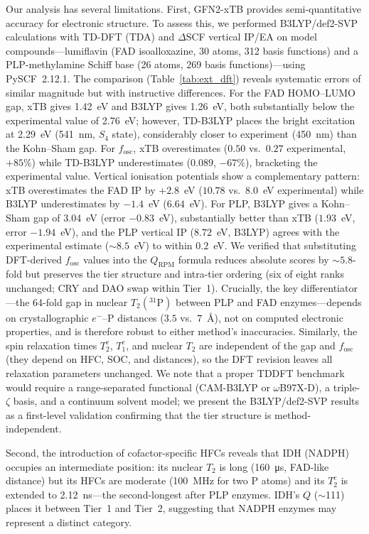 \documentclass[11pt]{article}
\begin{document}
Our analysis has several limitations. First, GFN2-xTB provides semi-quantitative accuracy for electronic structure. To assess this, we performed B3LYP/def2-SVP calculations with TD-DFT (TDA) and $\Delta$SCF vertical IP/EA on model compounds---lumiflavin (FAD isoalloxazine, 30 atoms, 312 basis functions) and a PLP-methylamine Schiff base (26 atoms, 269 basis functions)---using PySCF~2.12.1. The comparison (Table~\ref{tab:ext_dft}) reveals systematic errors of similar magnitude but with instructive differences. For the FAD HOMO--LUMO gap, xTB gives 1.42~eV and B3LYP gives 1.26~eV, both substantially below the experimental value of 2.76~eV; however, TD-B3LYP places the bright excitation at 2.29~eV (541~nm, $S_4$ state), considerably closer to experiment (450~nm) than the Kohn--Sham gap. For $f_\mathrm{osc}$, xTB overestimates ($0.50$ vs.\ $0.27$ experimental, $+85\%$) while TD-B3LYP underestimates ($0.089$, $-67\%$), bracketing the experimental value. Vertical ionisation potentials show a complementary pattern: xTB overestimates the FAD IP by $+2.8$~eV ($10.78$ vs.\ $8.0$~eV experimental) while B3LYP underestimates by $-1.4$~eV ($6.64$~eV). For PLP, B3LYP gives a Kohn--Sham gap of 3.04~eV (error $-0.83$~eV), substantially better than xTB ($1.93$~eV, error $-1.94$~eV), and the PLP vertical IP ($8.72$~eV, B3LYP) agrees with the experimental estimate ($\sim$$8.5$~eV) to within $0.2$~eV. We verified that substituting DFT-derived $f_\mathrm{osc}$ values into the $Q_\mathrm{RPM}$ formula reduces absolute scores by $\sim$$5.8$-fold but preserves the tier structure and intra-tier ordering (six of eight ranks unchanged; CRY and DAO swap within Tier~1). Crucially, the key differentiator---the 64-fold gap in nuclear $T_2(^{31}\mathrm{P})$ between PLP and FAD enzymes---depends on crystallographic $e^-$--P distances ($3.5$ vs.\ $7$~\AA), not on computed electronic properties, and is therefore robust to either method's inaccuracies. Similarly, the spin relaxation times $T_2^e$, $T_1^e$, and nuclear $T_2$ are independent of the gap and $f_\mathrm{osc}$ (they depend on HFC, SOC, and distances), so the DFT revision leaves all relaxation parameters unchanged. We note that a proper TDDFT benchmark would require a range-separated functional (CAM-B3LYP or $\omega$B97X-D), a triple-$\zeta$ basis, and a continuum solvent model; we present the B3LYP/def2-SVP results as a first-level validation confirming that the tier structure is method-independent.

Second, the introduction of cofactor-specific HFCs reveals that IDH (NADPH) occupies an intermediate position: its nuclear $T_2$ is long (160~\si{\micro\second}, FAD-like distance) but its HFCs are moderate (100~MHz for two P atoms) and its $T_2^e$ is extended to 2.12~ns---the second-longest after PLP enzymes. IDH's $Q$ ($\sim$111) places it between Tier~1 and Tier~2, suggesting that NADPH enzymes may represent a distinct category.
\end{document}
